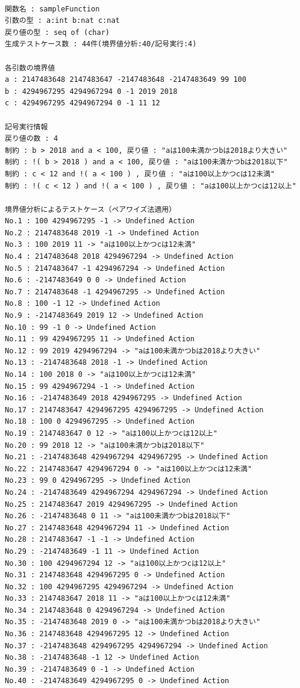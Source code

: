 \documentclass[uplatex, report, a4j, 10pt]{jsbook}
\begin{document}
\lstset{language=}
\noindent\begin{minipage}{\textwidth}
  \begin{lstlisting}[caption=コード\ref{fig:pict4javaSampleVdm}の適用結果,label=fig:pict4javaTekiyourei]

関数名 : sampleFunction
引数の型 : a:int b:nat c:nat 
戻り値の型 : seq of (char)
生成テストケース数 : 44件(境界値分析:40/記号実行:4)

各引数の境界値
a : 2147483648 2147483647 -2147483648 -2147483649 99 100 
b : 4294967295 4294967294 0 -1 2019 2018 
c : 4294967295 4294967294 0 -1 11 12 

記号実行情報
戻り値の数 : 4
制約 : b > 2018 and a < 100, 戻り値 : "aは100未満かつbは2018より大きい"
制約 : !( b > 2018 ) and a < 100, 戻り値 : "aは100未満かつbは2018以下"
制約 : c < 12 and !( a < 100 ) , 戻り値 : "aは100以上かつcは12未満"
制約 : !( c < 12 ) and !( a < 100 ) , 戻り値 : "aは100以上かつcは12以上"

境界値分析によるテストケース（ペアワイズ法適用）
No.1 : 100 4294967295 -1 -> Undefined Action
No.2 : 2147483648 2019 -1 -> Undefined Action
No.3 : 100 2019 11 -> "aは100以上かつcは12未満"
No.4 : 2147483648 2018 4294967294 -> Undefined Action
No.5 : 2147483647 -1 4294967294 -> Undefined Action
No.6 : -2147483649 0 0 -> Undefined Action
No.7 : 2147483648 -1 4294967295 -> Undefined Action
No.8 : 100 -1 12 -> Undefined Action
No.9 : -2147483649 2019 12 -> Undefined Action
No.10 : 99 -1 0 -> Undefined Action
No.11 : 99 4294967295 11 -> Undefined Action
No.12 : 99 2019 4294967294 -> "aは100未満かつbは2018より大きい"
No.13 : -2147483648 2018 -1 -> Undefined Action
No.14 : 100 2018 0 -> "aは100以上かつcは12未満"
No.15 : 99 4294967294 -1 -> Undefined Action
No.16 : -2147483649 2018 4294967295 -> Undefined Action
No.17 : 2147483647 4294967295 4294967295 -> Undefined Action
No.18 : 100 0 4294967295 -> Undefined Action
No.19 : 2147483647 0 12 -> "aは100以上かつcは12以上"
No.20 : 99 2018 12 -> "aは100未満かつbは2018以下"
No.21 : -2147483648 4294967294 4294967295 -> Undefined Action
No.22 : 2147483647 4294967294 0 -> "aは100以上かつcは12未満"
No.23 : 99 0 4294967295 -> Undefined Action
No.24 : -2147483649 4294967294 4294967294 -> Undefined Action
No.25 : 2147483647 2019 4294967295 -> Undefined Action
No.26 : -2147483648 0 11 -> "aは100未満かつbは2018以下"
No.27 : 2147483648 4294967294 11 -> Undefined Action
No.28 : 2147483647 -1 -1 -> Undefined Action
No.29 : -2147483649 -1 11 -> Undefined Action
No.30 : 100 4294967294 12 -> "aは100以上かつcは12以上"
No.31 : 2147483648 4294967295 0 -> Undefined Action
No.32 : 100 4294967295 4294967294 -> Undefined Action
No.33 : 2147483647 2018 11 -> "aは100以上かつcは12未満"
No.34 : 2147483648 0 4294967294 -> Undefined Action
No.35 : -2147483648 2019 0 -> "aは100未満かつbは2018より大きい"
No.36 : 2147483648 4294967295 12 -> Undefined Action
No.37 : -2147483648 4294967295 4294967294 -> Undefined Action
No.38 : -2147483648 -1 12 -> Undefined Action
No.39 : -2147483649 0 -1 -> Undefined Action
No.40 : -2147483649 4294967295 0 -> Undefined Action
\end{lstlisting}
\end{minipage}
\end{document}

